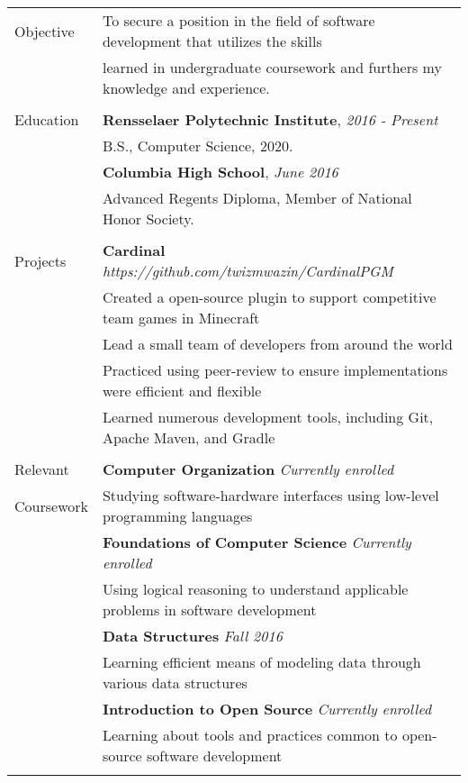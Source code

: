 \documentclass[letterpaper,10pt,oneside]{article}
\begin{document}
\noindent
\begin{tabular}{@{} l l}

  \Large{Objective}
  & To secure a position in the field of software development that utilizes the skills \\
  & learned in undergraduate coursework and furthers my knowledge and experience. \\
  & \\

  \Large{Education}
  & \textbf{Rensselaer Polytechnic Institute}, \textit{2016 - Present} \\
  & B.S., Computer Science, 2020. \\
  & \textbf{Columbia High School}, \textit{June 2016} \\
  & Advanced Regents Diploma, Member of National Honor Society. \\
  & \\

  \Large{Projects}
  & \textbf{Cardinal} \textit{https://github.com/twizmwazin/CardinalPGM} \\
  & Created a open-source plugin to support competitive team games in Minecraft \\
  & Lead a small team of developers from around the world \\
  & Practiced using peer-review to ensure implementations were efficient and flexible \\
  & Learned numerous development tools, including Git, Apache Maven, and Gradle \\
  & \\

  \Large{Relevant}
  & \textbf{Computer Organization} \textit{Currently enrolled} \\
  \Large{Coursework}
  & Studying software-hardware interfaces using low-level programming languages \\
  & \textbf{Foundations of Computer Science} \textit{Currently enrolled} \\
  & Using logical reasoning to understand applicable problems in software development \\
  & \textbf{Data Structures} \textit{Fall 2016} \\
  & Learning efficient means of modeling data through various data structures \\
  & \textbf{Introduction to Open Source} \textit{Currently enrolled} \\
  & Learning about tools and practices common to open-source software development \\
  & \\


\end{tabular}
\end{document}
